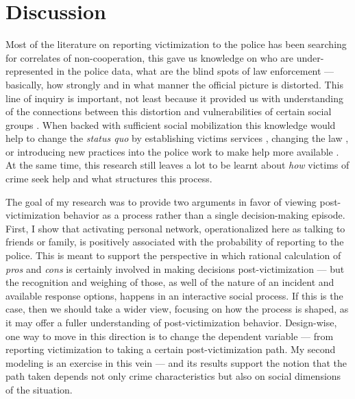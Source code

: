 \documentclass[]{interact}
\theoremstyle{plain}%
\theoremstyle{definition}
\theoremstyle{remark}
\newcommand\citep{\parencite}
\begin{document}
	\section*{Discussion}
	\label{sec:discussion}
	
	Most of the literature on reporting victimization to the police has been searching for correlates of non-cooperation, this gave us knowledge on who are under-represented in the police data, what are the blind spots of law enforcement --- basically, how strongly and in what manner the official picture is distorted. This line of inquiry is important, not least because it provided us with understanding of the connections between this distortion and vulnerabilities of certain social groups \citep{warner2007directly,orcutt1988sex,gartner1995effect}. When backed with sufficient social mobilization this knowledge would help to change the \textit{status quo} by establishing victims services \citep{maguire1988victims}, changing the law \citep{spohn1992rape}, or introducing new practices into the police work to make help more available \citep{sukhtankar2022policing}. At the same time, this research still leaves a lot to be learnt about \textit{how} victims of crime seek help and what structures this process. 
	
	The goal of my research was to provide two arguments in favor of viewing post-victimization behavior as a process rather than a single decision-making episode. First, I show that activating personal network, operationalized here as talking to friends or family, is positively associated with the probability of reporting to the police. This is meant to support the perspective in which rational calculation of \textit{pros} and \textit{cons} is certainly involved in making decisions post-victimization --- but the recognition and weighing of those, as well of the nature of an incident and available response options, happens in an interactive social process. If this is the case, then we should take a wider view, focusing on how the process is shaped, as it may offer a fuller understanding of post-victimization behavior. Design-wise, one way to move in this direction is to change the dependent variable --- from reporting victimization to taking a certain post-victimization path. My second modeling is an exercise in this vein --- and its results support the notion that the path taken depends not only crime characteristics but also on social dimensions of the situation. 
	
\end{document}
